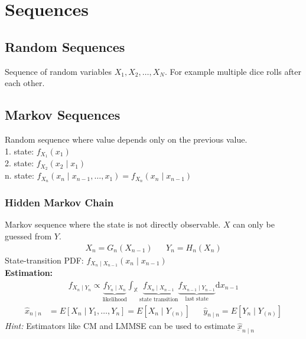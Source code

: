 \section{Sequences}
\begin{mdframed}[style=eqbox]
  \subsection{Random Sequences}
  Sequence of random variables $X_1, X_2, \ldots, X_N$. For example multiple dice rolls after each other.
  \subsection{Markov Sequences}
  Random sequence where value depends only on the previous value.\\
  1. state: $f_{X_1}(x_1)$\\
  2. state: $f_{X_2}(x_2 \mid x_1)$\\
  n. state: $f_{X_n}(x_n \mid x_{n-1}, \ldots, x_1) = f_{X_n}(x_n \mid x_{n-1})$
  \subsubsection{Hidden Markov Chain}
  Markov sequence where the state is not directly observable. $X$ can only be guessed from $Y$.
  \vspace*{-4pt}
  \begin{align*}
    X_n = G_n(X_{n-1}) && Y_n = H_n(X_n)
  \end{align*}
  State-transition PDF: $f_{X_n\mid X_{n-1}}(x_n \mid x_{n-1})$\\[0.25em]
  \textbf{Estimation:}
  \vspace*{-4pt}
  \begin{align*}
    f_{X_n \mid Y_n} \propto \underbrace{f_{Y_n \mid X_n}}_{\text{likelihood}} \int_{\mathbb{X}} \underbrace{f_{X_n \mid X_{n-1}}}_{\text{state transition}} \underbrace{f_{X_{n-1} \mid Y_{n-1}}}_{\text{last state}} \text{d}x_{n-1}
  \end{align*}\vspace*{-16pt}
  \begin{align*}
    \hat{x}_{n \mid n} &= E[X_n \mid Y_1, \ldots, Y_n] = E[X_n \mid Y_{(n)}] && \hat{y}_{n \mid n} = E[Y_n \mid Y_{(n)}]
  \end{align*}
  \textit{Hint:} Estimators like CM and LMMSE can be used to estimate $\hat{\underbar{x}}_{n \mid n}$
\end{mdframed}

